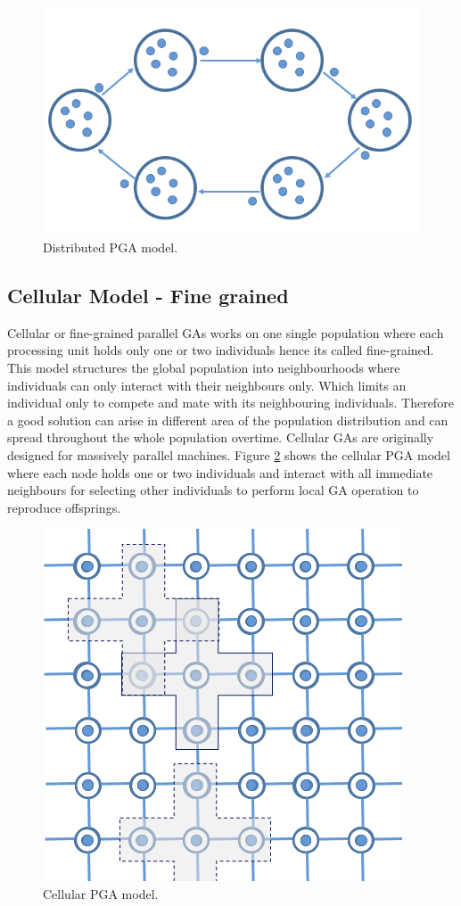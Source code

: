 \begin{figure}[!htb]
\begin{center}
  \includegraphics[width= 0.7 \linewidth]{figs/pga_distributed.png}
  \caption{Distributed PGA model.}
  \label{fig:pga_distributed}
  \end{center}
\end{figure}

\subsection{Cellular Model - Fine grained}
Cellular or fine-grained parallel GAs works on one single population where each processing unit holds only one or two individuals hence its called fine-grained. This model structures the global population into neighbourhoods where individuals can only interact with their neighbours only. Which limits an individual only to compete and mate with its neighbouring individuals. Therefore a good solution can arise in different area of the population distribution and can spread throughout the whole population overtime. Cellular GAs are originally designed for massively parallel machines. Figure \ref{fig:pga_cellular} shows the cellular PGA model where each node holds one or two individuals and interact with all immediate neighbours for selecting other individuals to perform local GA operation to reproduce offsprings. 

\begin{figure}[!htb]
\begin{center}
  \includegraphics[width=.5 \linewidth]{figs/pga_cellular.png}
  \caption{Cellular PGA model.}
  \label{fig:pga_cellular}
  \end{center}
\end{figure}


